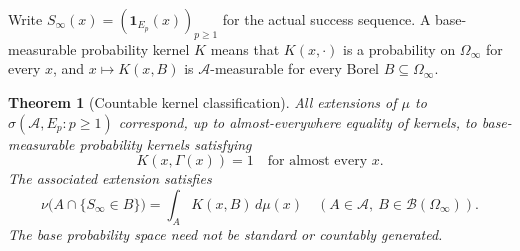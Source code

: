 \documentclass[11pt,letterpaper]{article}
\newtheorem{theorem}{Theorem}[section]
\theoremstyle{definition}
\newcommand{\ind}{\mathbf 1}
\newcommand{\A}{\mathcal A}
\newcommand{\B}{\mathcal B}
\begin{document}
Write $S_\infty(x)=(\ind_{E_p}(x))_{p\ge1}$ for the actual success sequence. A base-measurable probability kernel $K$ means that $K(x,\cdot)$ is a probability on $\Omega_\infty$ for every $x$, and $x\mapsto K(x,B)$ is $\A$-measurable for every Borel $B\subseteq\Omega_\infty$.

\begin{theorem}[Countable kernel classification]
\label{mbg:ext:thm:kernel}
All extensions of $\mu$ to $\sigma(\A,E_p:p\ge1)$ correspond, up to almost-everywhere equality of kernels, to base-measurable probability kernels satisfying
\begin{equation}
K(x,\Gamma(x))=1\quad\text{for almost every }x.
\label{mbg:ext:eq:kernel-support}
\end{equation}
The associated extension satisfies
\begin{equation}
\nu\bigl(A\cap\{S_\infty\in B\}\bigr)
=\int_A K(x,B)\,d\mu(x)
\quad(A\in\A,\ B\in\B(\Omega_\infty)).
\label{mbg:ext:eq:kernel-law}
\end{equation}
The base probability space need not be standard or countably generated.
\end{theorem}
\end{document}
